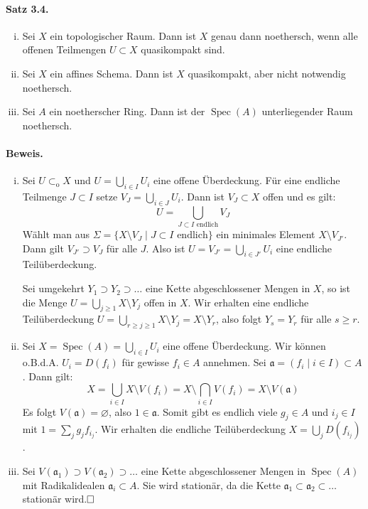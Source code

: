 \documentclass[11pt,b5paper,openany]{memoir}
\def \qed {$\hfill\square$}
\begin{document}
\paragraph{Satz 3.4.}\label{3.4} \begin{enumerate}[(i)]
\item Sei $X$ ein topologischer Raum. Dann ist $X$ genau dann noethersch, wenn alle offenen Teilmengen $U\subset X$ quasikompakt sind.
\item Sei $X$ ein affines Schema. Dann ist $X$ quasikompakt, aber nicht notwendig noethersch.
\item Sei $A$ ein noetherscher Ring. Dann ist der $\operatorname{Spec}(A)$ unterliegender Raum noethersch.
\end{enumerate}

\paragraph{Beweis.}\begin{enumerate}[(i)]
\item Sei $U\subset_\text{o}X$ und $U=\bigcup_{i\in I}U_i$ eine offene Überdeckung. Für eine endliche Teilmenge $J\subset I$ setze $V_J=\bigcup_{i\in J}U_i$. Dann ist $V_J\subset X$ offen und es gilt:
\[U=\bigcup_{J\subset I\text{ endlich}}V_J \]
Wählt man aus $\Sigma=\{X\setminus V_J\mid J\subset I\text{ endlich}\}$ ein minimales Element $X\setminus V_{J'}$. Dann gilt $V_{J'}\supset V_J$ für alle $J$. Also ist $U=V_{J'}=\bigcup_{i\in J'}U_i$ eine endliche Teilüberdeckung.

Sei umgekehrt $Y_1\supset Y_2\supset\ldots$ eine Kette abgeschlossener Mengen in $X$, so ist die Menge $U=\bigcup_{j\geq 1}X\setminus Y_j$ offen in $X$. Wir erhalten eine endliche Teilüberdeckung $U=\bigcup_{r\geq j\geq 1}X\setminus Y_j=X\setminus Y_r$, also folgt $Y_s=Y_r$ für alle $s\geq r$.
\item Sei $X=\operatorname{Spec}(A)=\bigcup_{i\in I}U_i$ eine offene Überdeckung. Wir können o.B.d.A. $U_i=D(f_i)$ für gewisse $f_i\in A$ annehmen. Sei $\mathfrak{a}=(f_i\mid i\in I)\subset A$. Dann gilt:
\[X=\bigcup_{i\in I}X\setminus V(f_i) = X\setminus\bigcap_{i\in I}V(f_i)=X\setminus V(\mathfrak{a}) \]
Es folgt $V(\mathfrak{a})=\varnothing$, also $1\in\mathfrak{a}$. Somit gibt es endlich viele $g_j\in A$ und $i_j\in I$ mit $1=\sum_j g_jf_{i_j}$. Wir erhalten die endliche Teilüberdeckung $X=\bigcup_j D(f_{i_j})$.
\item Sei $V(\mathfrak{a}_1)\supset V(\mathfrak{a}_2)\supset\ldots$ eine Kette abgeschlossener Mengen in $\operatorname{Spec}(A)$ mit Ra\-di\-kal\-idealen $\mathfrak{a}_i\subset A$. Sie wird stationär, da die Kette $\mathfrak{a}_1\subset \mathfrak{a}_2\subset\ldots$ stationär wird.\qed
\end{enumerate}
\end{document}
